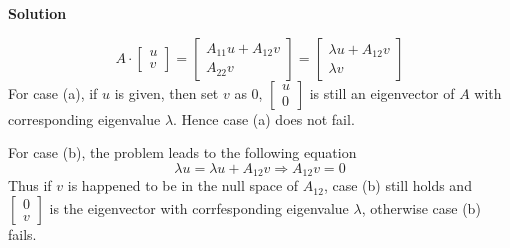 \documentclass[12pt,oneside,a4paper]{article}
\newcommand{\solution}
{
    \vspace{15pt}
    \noindent\ignorespaces\textbf{\large Solution}\par
}
\begin{document}
\solution
$$A \cdot \begin{bmatrix}u \\ v \end{bmatrix} = \begin{bmatrix} A_{11}u + A_{12}v \\ A_{22}v\end{bmatrix} = \begin{bmatrix} \lambda u + A_{12}v \\ \lambda v\end{bmatrix}$$
For case (a), if $u$ is given, then set $v$ as 0, $\begin{bmatrix} u \\ 0 \end{bmatrix}$ is still an eigenvector of $A$ with corresponding eigenvalue $\lambda$. Hence case (a) does not fail.

For case (b), the problem leads to the following equation
$$\lambda u = \lambda u + A_{12}v \Rightarrow A_{12}v = 0$$
Thus if $v$ is happened to be in the null space of $A_{12}$, case (b) still holds and $\begin{bmatrix} 0 \\ v \end{bmatrix}$ is the eigenvector with corrfesponding eigenvalue $\lambda$, otherwise case (b) fails.
\end{document}
